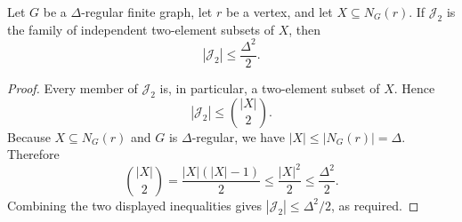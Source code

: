 \begin{helper}
Let $G$ be a $\Delta$-regular finite graph, let $r$ be a vertex, and let
$X\subseteq N_G(r)$.  If $\mathcal J_2$ is the family of independent
two-element subsets of $X$, then
\[
|\mathcal J_2|\le \frac{\Delta^2}{2}.
\]
\end{helper}
\begin{proof}
Every member of $\mathcal J_2$ is, in particular, a two-element subset of
$X$.  Hence
\[
|\mathcal J_2|\le \binom{|X|}{2}.
\]
Because $X\subseteq N_G(r)$ and $G$ is $\Delta$-regular, we have
$|X|\le |N_G(r)|=\Delta$.  Therefore
\[
\binom{|X|}{2}
=\frac{|X|(|X|-1)}2
\le \frac{|X|^2}{2}
\le \frac{\Delta^2}{2}.
\]
Combining the two displayed inequalities gives
$|\mathcal J_2|\le \Delta^2/2$, as required.
\end{proof}
